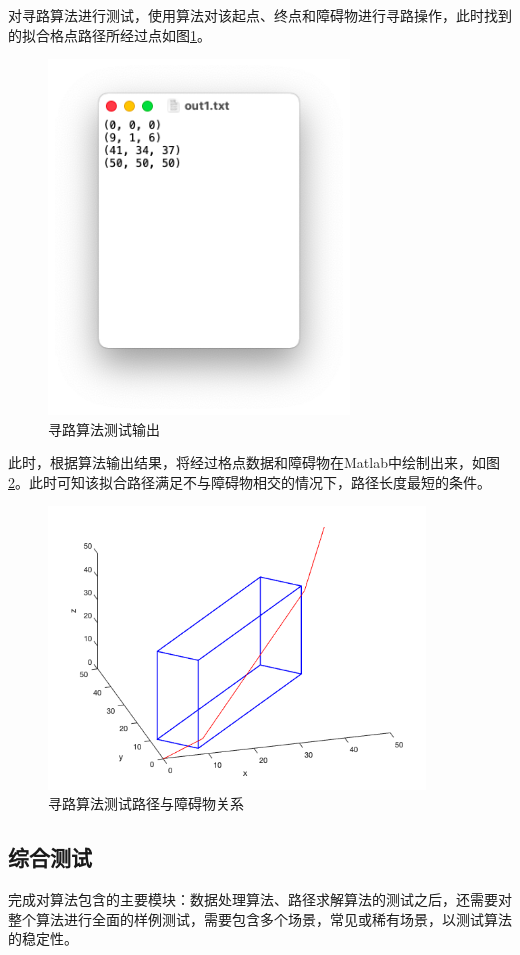 \par 对寻路算法进行测试，使用算法对该起点、终点和障碍物进行寻路操作，此时找到的拟合格点路径所经过点如图\ref{fig:find_path_ex_out}。
\begin{figure}[!htb]
    \centering
    \includegraphics[width=8cm]{figures/find_path_ex_out.png}
    \caption{寻路算法测试输出}
    \label{fig:find_path_ex_out}
\end{figure}
此时，根据算法输出结果，将经过格点数据和障碍物在Matlab中绘制出来，如图\ref{fig:find_path_ex_paint}。此时可知该拟合路径满足不与障碍物相交的情况下，路径长度最短的条件。
\begin{figure}[!htb]
    \centering
    \includegraphics[width=10cm]{figures/find_path_ex_paint.png}
    \caption{寻路算法测试路径与障碍物关系}
    \label{fig:find_path_ex_paint}
\end{figure}

\subsection{综合测试}
\par 完成对算法包含的主要模块：数据处理算法、路径求解算法的测试之后，还需要对整个算法进行全面的样例测试，需要包含多个场景，常见或稀有场景，以测试算法的稳定性。

